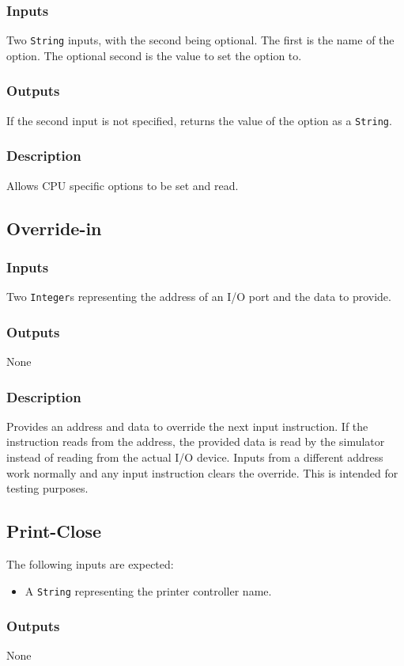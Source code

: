 \documentclass[10pt, openany]{book}
\newcommand{\datatype}[1]{\texttt{#1}}
\begin{document}
\subsubsection{Inputs}
Two \datatype{String} inputs, with the second being optional.
The first is the name of the option.
The optional second is the value to set the option to.
\subsubsection{Outputs}
If the second input is not specified, returns the value of the option as a \datatype{String}.
\subsubsection{Description}
Allows CPU specific options to be set and read.

\subsection{Override-in}
\subsubsection{Inputs}
Two \datatype{Integer}s representing the address of an I/O port and the data to provide.
\subsubsection{Outputs}
None
\subsubsection{Description}
Provides an address and data to override the next input instruction.
If the instruction reads from the address, the provided data is read by the simulator instead of reading from the actual I/O device.
Inputs from a different address work normally and any input instruction clears the override.
This is intended for testing purposes.

\subsection{Print-Close}
The following inputs are expected:
\begin{itemize}
  \item A \datatype{String} representing the printer controller name.
\end{itemize}
\subsubsection{Outputs}
None
\end{document}
